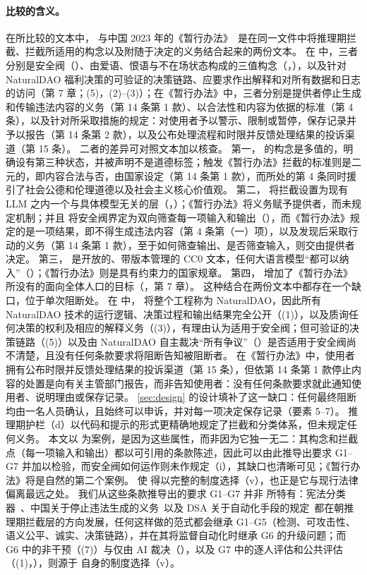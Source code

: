 \paragraph{比较的含义。}
在所比较的文本中，\pol{} 与中国 2023 年的《暂行办法》~\cite{cac2023genai}是在同一文件中将推理期拦截、拦截所适用的构念以及附随于决定的义务结合起来的两份文本。
在 \pol{} 中，三者分别是安全阀（）、由爱语、恨语与不在场状态构成的三值构念（，），以及针对 NaturalDAO 福利决策的可验证的决策链路、应要求作出解释和对所有数据和日志的访问（第 7 章；(5)，(2)--(3)）；在《暂行办法》中，三者分别是提供者停止生成和传输违法内容的义务（第 14 条第 1 款）、以合法性和内容为依据的标准（第 4 条），以及针对所采取措施的规定：对使用者予以警示、限制或暂停，保存记录并予以报告（第 14 条第 2 款），以及公布处理流程和时限并反馈处理结果的投诉渠道（第 15 条）。
二者的差异可对照文本加以核查。
第一，\pol{} 的构念是多值的，明确设有第三种状态，并被声明不是道德标签；触发《暂行办法》拦截的标准则是二元的，即内容合法与否，由国家设定（第 14 条第 1 款），而所处的第 4 条同时援引了社会公德和伦理道德以及社会主义核心价值观。
第二，\pol{} 将拦截设置为现有 LLM 之内一个与具体模型无关的层（，）；《暂行办法》将义务赋予提供者，而未规定机制；并且 \pol{} 将安全阀界定为双向筛查每一项输入和输出（），而《暂行办法》规定的是一项结果，即不得生成违法内容（第 4 条第（一）项），以及发现后采取行动的义务（第 14 条第 1 款），至于如何筛查输出、是否筛查输入，则交由提供者决定。
第三，\pol{} 是开放的、带版本管理的 CC0 文本，任何大语言模型“都可以纳入”（）；《暂行办法》则是具有约束力的国家规章。
第四，\pol{} 增加了《暂行办法》所没有的面向全体人口的目标（，第 7 章）。
这种结合在两份文本中都存在一个缺口，位于单次阻断处。
在 \pol{} 中， 将整个工程称为 NaturalDAO，因此所有 NaturalDAO 技术的运行逻辑、决策过程和输出结果完全公开（(1)），以及质询任何决策的权利及相应的解释义务（(3)），有理由认为适用于安全阀；但可验证的决策链路（(5)）以及由 NaturalDAO 自主裁决“所有争议”（）是否适用于安全阀尚不清楚，且没有任何条款要求将阻断告知被阻断者。
在《暂行办法》中，使用者拥有公布时限并反馈处理结果的投诉渠道（第 15 条），但依第 14 条第 1 款停止内容的处置是向有关主管部门报告，而非告知使用者：没有任何条款要求就此通知使用者、说明理由或保存记录。
\cref{sec:design} 的设计填补了这一缺口：任何最终阻断均由一名人员确认，且始终可以申诉，并对每一项决定保存记录（要素 5--7）。
推理期护栏（d）以代码和提示的形式更精确地规定了拦截和分类体系，但未规定任何义务。
本文以 \pol{} 为案例，是因为这些属性，而非因为它独一无二：其构念和拦截点（每一项输入和输出）都以可引用的条款陈述，因此可以由此推导出要求 G1--G7 并加以检验，而安全阀如何运作则未作规定（i），其缺口也清晰可见；《暂行办法》将是自然的第二个案例。
使 \pol{} 得以完整的制度选择（v），也正是它与现行法律偏离最远之处。
我们从这些条款推导出的要求 G1--G7 并非 \pol{} 所特有：宪法分类器~\cite{sharma2025constitutional}、中国关于停止违法生成的义务~\cite{cac2023genai}以及 DSA 关于自动化手段的规定~\cite{dsa2022}都在朝推理期拦截层的方向发展，任何这样做的范式都会继承 G1--G5（检测、可攻击性、语义公平、诚实、决策链路），并在其将监督自动化时继承 G6 的升级问题；而 G6 中的非干预（(7)）与仅由 AI 裁决（），以及 G7 中的逐人评估和公共评估（(1)，），则源于 \pol{} 自身的制度选择（v）。
